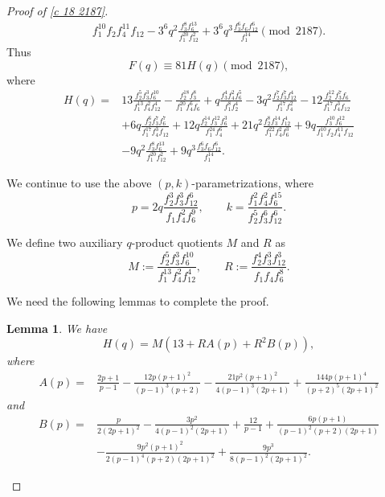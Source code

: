 \documentclass[12pt]{article}
\numberwithin{equation}{section}
\theoremstyle{plain}
\numberwithin{theorem}{section}
\newtheorem{lemma}[theorem]{Lemma}
\theoremstyle{definition}
\theoremstyle{remark}
\begin{document}
\begin{proof}[Proof of \eqref{c 18 2187}]
\begin{align*}
     {f_1^{10}f_2f_4^{11}f_{12}}
-
3^6q^2
\frac{f_3^8f_6^{13}}
     {f_1^{20}f_{12}^2}
+
3^6q^3
\frac{f_3^6f_6f_{12}^6}
     {f_1^{14}}
\pmod{2187}.
\end{align*}
Thus
\begin{equation*}
F(q)\equiv81H(q)\pmod{2187},
\end{equation*}
where
\begin{align*}
H(q)
=&
13
\frac{f_2^5f_3^3f_6^{10}}
     {f_1^{13}f_4^2f_{12}^4}
-
\frac{f_2^{18}f_3^8}
     {f_1^{20}f_4^6f_6}
+
q
\frac{f_3^4f_4^2f_6^5}
     {f_1^8f_2^4}
-
3q^2
\frac{f_2^7f_3^7f_{12}^4}
     {f_1^{17}f_4^2}
-
12
\frac{f_2^{12}f_3^7f_6}
     {f_1^{17}f_4^3f_{12}}
     \\
&+
6q
\frac{f_2^6f_3^7f_6^7}
     {f_1^{17}f_4^3f_{12}}
+
12q
\frac{f_2^{14}f_3^{12}f_6^3}
     {f_1^{24}f_4^6}
+
21q^2
\frac{f_2^8f_3^{14}f_{12}^4}
     {f_1^{22}f_4^2f_6^3}
+
9q
\frac{f_3^{10}f_6^{12}}
     {f_1^{10}f_2f_4^{11}f_{12}}
\\
&-
9q^2
\frac{f_3^8f_6^{13}}
     {f_1^{20}f_{12}^2}
+
9q^3
\frac{f_3^6f_6f_{12}^6}
     {f_1^{14}}.
\end{align*}

We continue to use the above $(p,k)$-parametrizations, where
\begin{equation*}
p=
2q\frac{f_2^3f_3^3f_{12}^6}
        {f_1f_4^2f_6^9},
\qquad
k=
\frac{f_1^2f_4^2f_6^{15}}
     {f_2^5f_3^6f_{12}^6}.
\end{equation*}

We define two auxiliary $q$-product quotients $M$ and $R$ as
\begin{equation*}
M:=
\frac{f_2^5f_3^3f_6^{10}}
     {f_1^{13}f_4^2f_{12}^4},
\qquad
R:=
\frac{f_2^4f_3^3f_{12}^3}
     {f_1f_4f_6^8}.
\end{equation*}


We need the following lemmas to complete the proof.
\begin{lemma}\label{lem:H-decomp}
We have
\begin{equation*}
H(q)=M\left(13+RA(p)+R^2B(p)\right),
\end{equation*}
where
\begin{align*}
A(p)
={}&
\frac{2p+1}{p-1}
-
\frac{12p(p+1)^2}
     {(p-1)^3(p+2)}
-
\frac{21p^2(p+1)^2}
     {4(p-1)^3(2p+1)}
+
\frac{144p(p+1)^4}
     {(p+2)^5(2p+1)^2}
\end{align*}
and
\begin{align*}
B(p)
={}&
\frac{p}{2(2p+1)^2}
-
\frac{3p^2}
     {4(p-1)^2(2p+1)}
+
\frac{12}{p-1}
+
\frac{6p(p+1)}
     {(p-1)^2(p+2)(2p+1)}
\\
&-
\frac{9p^2(p+1)^2}
     {2(p-1)^4(p+2)(2p+1)^2}
+
\frac{9p^3}
     {8(p-1)^2(2p+1)^2}.
\end{align*}
\end{lemma}


\end{proof}
\end{document}
